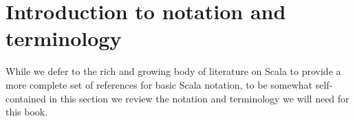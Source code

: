 \section{Introduction to notation and terminology}

While we defer to the rich and growing body of literature on Scala to
provide a more complete set of references for basic Scala notation, to
be somewhat self-contained in this section we review the notation and
terminology we will need for this book.
